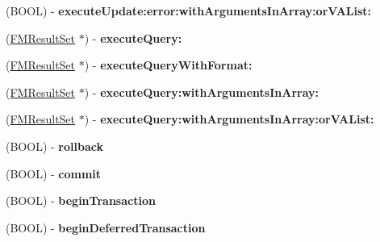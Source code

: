 \begin{DoxyCompactItemize}
\item 
\hypertarget{interface_f_m_database_a3b071d8f0e78bc2b55dd7a50aeea4433}{
(BOOL) -\/ {\bfseries executeUpdate:error:withArgumentsInArray:orVAList:}}
\label{interface_f_m_database_a3b071d8f0e78bc2b55dd7a50aeea4433}

\item 
\hypertarget{interface_f_m_database_aaa9d4e663c9427970a6ab1fa1db81930}{
(\hyperlink{interface_f_m_result_set}{FMResultSet} $\ast$) -\/ {\bfseries executeQuery:}}
\label{interface_f_m_database_aaa9d4e663c9427970a6ab1fa1db81930}

\item 
\hypertarget{interface_f_m_database_a68ad8597e3e9f709937c5d242e7be6cf}{
(\hyperlink{interface_f_m_result_set}{FMResultSet} $\ast$) -\/ {\bfseries executeQueryWithFormat:}}
\label{interface_f_m_database_a68ad8597e3e9f709937c5d242e7be6cf}

\item 
\hypertarget{interface_f_m_database_a9d4d6047ba52d46b7ad0788121c7062e}{
(\hyperlink{interface_f_m_result_set}{FMResultSet} $\ast$) -\/ {\bfseries executeQuery:withArgumentsInArray:}}
\label{interface_f_m_database_a9d4d6047ba52d46b7ad0788121c7062e}

\item 
\hypertarget{interface_f_m_database_a598f5b286bfc5348e3f9b43c1322b854}{
(\hyperlink{interface_f_m_result_set}{FMResultSet} $\ast$) -\/ {\bfseries executeQuery:withArgumentsInArray:orVAList:}}
\label{interface_f_m_database_a598f5b286bfc5348e3f9b43c1322b854}

\item 
\hypertarget{interface_f_m_database_aca57bb48b7b6bd6b72d792aa6aec64d8}{
(BOOL) -\/ {\bfseries rollback}}
\label{interface_f_m_database_aca57bb48b7b6bd6b72d792aa6aec64d8}

\item 
\hypertarget{interface_f_m_database_a519cd86399c732163b05b0e98e5099c6}{
(BOOL) -\/ {\bfseries commit}}
\label{interface_f_m_database_a519cd86399c732163b05b0e98e5099c6}

\item 
\hypertarget{interface_f_m_database_a33e9a1ee03b77f79325d6dac83338341}{
(BOOL) -\/ {\bfseries beginTransaction}}
\label{interface_f_m_database_a33e9a1ee03b77f79325d6dac83338341}

\item 
\hypertarget{interface_f_m_database_afd7dd530bc2b567a364eac1b2e749c89}{
(BOOL) -\/ {\bfseries beginDeferredTransaction}}
\label{interface_f_m_database_afd7dd530bc2b567a364eac1b2e749c89}


\end{DoxyCompactItemize}

